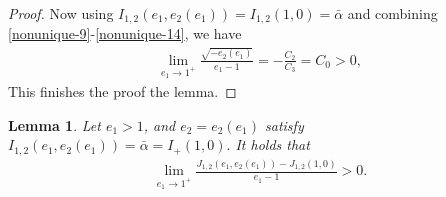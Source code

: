 \documentclass[reqno,12pt]{amsart}
\newtheorem{lemma}[theorem]{Lemma}
\begin{document}
\begin{proof}
Now using $I_{1, 2}(e_1, e_2(e_1)) = I_{1, 2}(1, 0) =\bar{\alpha}$ and combining  \eqref{nonunique-9}-\eqref{nonunique-14}, we have 
\begin{align*}
    \lim_{e_1\to 1^+} \frac{\sqrt{-e_2(e_1)}}{e_1 -1}= -\frac{C_2}{C_3}=C_0>0,
\end{align*}
This finishes the proof  the lemma.
\end{proof}


\begin{lemma}\label{Lemmanonunique-4}
Let $e_1 > 1$, and $e_2 = e_2(e_1)$ satisfy 
    $I_{1, 2}(e_1, e_2(e_1)) = \bar{\alpha} =I_{+}(1, 0).$ 
It holds that 
\begin{align*}    
\lim_{e_1 \to 1^+} \frac{J_{1, 2}(e_1, e_2(e_1)) - J_{1, 2}(1, 0)}{e_1 -1}>0.
\end{align*}
\end{lemma}
\end{document}
